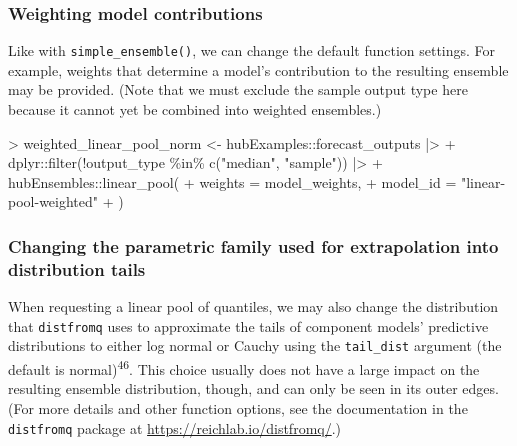 \documentclass[
  letterpaper,
  DIV=11,
  numbers=noendperiod]{scrartcl}
\newenvironment{Shaded}{\begin{snugshade}}{\end{snugshade}}
\newcommand{\AttributeTok}[1]{\textcolor[rgb]{0.40,0.45,0.13}{#1}}
\newcommand{\FunctionTok}[1]{\textcolor[rgb]{0.28,0.35,0.67}{#1}}
\newcommand{\NormalTok}[1]{\textcolor[rgb]{0.00,0.23,0.31}{#1}}
\newcommand{\OtherTok}[1]{\textcolor[rgb]{0.00,0.23,0.31}{#1}}
\newcommand{\SpecialCharTok}[1]{\textcolor[rgb]{0.37,0.37,0.37}{#1}}
\newcommand{\StringTok}[1]{\textcolor[rgb]{0.13,0.47,0.30}{#1}}
\begin{document}
\subsubsection{Weighting model
contributions}\label{weighting-model-contributions-1}

Like with \texttt{simple\_ensemble()}, we can change the default
function settings. For example, weights that determine a model's
contribution to the resulting ensemble may be provided. (Note that we
must exclude the sample output type here because it cannot yet be
combined into weighted ensembles.)

\begin{Shaded}
\begin{Highlighting}[]
\SpecialCharTok{\textgreater{}}\NormalTok{ weighted\_linear\_pool\_norm }\OtherTok{\textless{}{-}}\NormalTok{ hubExamples}\SpecialCharTok{::}\NormalTok{forecast\_outputs }\SpecialCharTok{|\textgreater{}}
\SpecialCharTok{+}\NormalTok{   dplyr}\SpecialCharTok{::}\FunctionTok{filter}\NormalTok{(}\SpecialCharTok{!}\NormalTok{output\_type }\SpecialCharTok{\%in\%} \FunctionTok{c}\NormalTok{(}\StringTok{"median"}\NormalTok{, }\StringTok{"sample"}\NormalTok{)) }\SpecialCharTok{|\textgreater{}}
\SpecialCharTok{+}\NormalTok{   hubEnsembles}\SpecialCharTok{::}\FunctionTok{linear\_pool}\NormalTok{(}
\SpecialCharTok{+}     \AttributeTok{weights =}\NormalTok{ model\_weights,}
\SpecialCharTok{+}     \AttributeTok{model\_id =} \StringTok{"linear{-}pool{-}weighted"}
\SpecialCharTok{+}\NormalTok{ )}
\end{Highlighting}
\end{Shaded}

\subsubsection{Changing the parametric family used for extrapolation
into distribution
tails}\label{changing-the-parametric-family-used-for-extrapolation-into-distribution-tails}

When requesting a linear pool of quantiles, we may also change the
distribution that \texttt{distfromq} uses to approximate the tails of
component models' predictive distributions to either log normal or
Cauchy using the \texttt{tail\_dist} argument (the default is
normal)\textsuperscript{46}. This choice usually does not have a large
impact on the resulting ensemble distribution, though, and can only be
seen in its outer edges. (For more details and other function options,
see the documentation in the \texttt{distfromq} package at
\url{https://reichlab.io/distfromq/}.)
\end{document}
